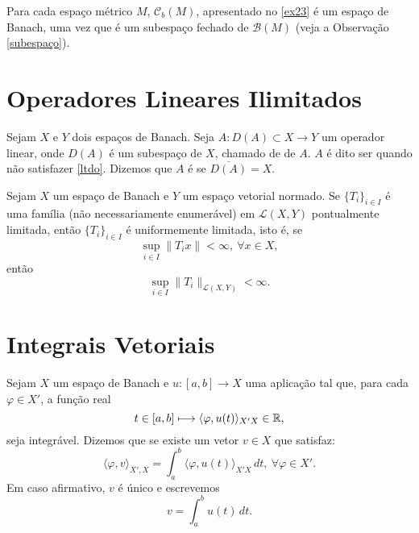 \begin{example}
    Para cada espaço métrico $M$, $\mathcal C _b (M)$, apresentado no \ref{ex23} é um espaço de Banach, uma vez que é um subespaço fechado de $\mathcal B (M)$ (veja a Observação \ref{subespaço}).
\end{example}

\section{Operadores Lineares Ilimitados}

Sejam $X$ e $Y$ dois espaços de Banach. Seja $A:D(A)\subset X\longrightarrow Y$ um operador linear,  onde $D(A)$ é um subespaço de $X$, chamado de  de $A$.
$A$ é dito ser   quando não satisfazer \eqref{ltdo}. Dizemos que $A$ é   se $\overline{D(A)}=X$.

\begin{theorem}\label{th-BS}
	Sejam $X$ um espaço de Banach e $Y$ um espaço vetorial normado. Se $\{T_i\}_{i\in I}$  é uma família (não necessariamente enumerável) em $\mathcal{L}(X,Y)$ pontualmente limitada, então $\{T_i\}_{i\in I}$ é uniformemente limitada, isto é, se 
	 \[\sup_{i\in I}\|T_ix\|< \infty,\ \forall x\in X,\] 
	 então
	 \[\sup_{i\in I}\|T_i\|_{\mathcal{L}(X,Y)}<\infty.\]
\end{theorem}

\section{Integrais Vetoriais}

\begin{definition}
Sejam $X$ um espaço de Banach e $u:[a,b]\longrightarrow X$ uma aplicação tal que, para cada $\varphi\in X'$,  a função real
\[t\in [a,b] \longmapsto \langle\varphi, u(t) \rangle_{X'X}\in \mathbb{R},\]
seja integrável. Dizemos que  se existe um vetor $v\in X$ que satisfaz:
\[\langle \varphi, v\rangle_{X',X}=\int_a^b \langle\varphi, u(t) \rangle_{X'X}\,dt,\ \forall \varphi\in X'.\]
Em caso afirmativo, $v$ é único e escrevemos
\[v=\int_a^b u(t)\,dt.\]
\end{definition}


